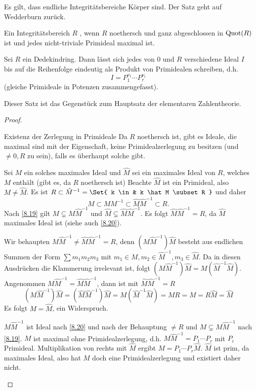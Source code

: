 \begin{nt*}
	Es gilt, dass endliche Integritätsbereiche Körper sind.
	Der Satz geht auf Wedderburn zurück. %
\end{nt*}

\begin{df} \label{8.16}
	Ein Integritätsbereich $R$ , wenn $R$ noethersch und ganz abgeschlossen in $\operatorname{Quot}(R)$ ist und jedes nicht-triviale Primideal maximal ist.
\end{df}

\begin{st} \label{8.17}
	Sei $R$ ein Dedekindring.
	Dann lässt sich jedes von $0$ und $R$ verschiedene Ideal $I$ bis auf die Reihenfolge eindeutig als Produkt von Primidealen schreiben, d.h.
	\[
		I = P_1^{\nu_1} \dotsb P_r^{\nu_r}
	\]
	(gleiche Primideale in Potenzen zusammengefasst).
	\begin{note}
		Dieser Satz ist das Gegenstück zum Hauptsatz der elementaren Zahlentheorie.
	\end{note}
	\begin{proof}
		\begin{seg}{Existenz der Zerlegung in Primideale}
			Da $R$ noethersch ist, gibt es Ideale, die maximal sind mit der Eigenschaft, keine Primidealzerlegung zu besitzen (und $\neq 0, R$ zu sein), falls es überhaupt solche gibt.

			Sei $M$ ein solches maximales Ideal und $\hat M$ sei ein maximales Ideal von $R$, welches $M$ enthält (gibt es, da $R$ noethersch ist)
			Beachte $\hat M$ ist ein Primideal, also $M \neq \hat M$.
			Es ist $R \subset \hat M^{-1} = \Set{ k \in  & k \hat M \subset R }$ und daher
			\[
				M \subset M M^{-1} \subset \hat M \hat M^{-1} \subset R.
			\]
			Nach \ref{8.19} gilt $M \subsetneq M \hat M^{-1}$ und $\hat M \subsetneq \hat M \hat M^{-1}$.
			Es folgt $\hat M \hat M^{-1} = R$, da $\hat M$ maximales Ideal ist (siehe auch \ref{8.20}).

			Wir behaupten $M \hat M^{-1} \neq \hat M \hat M^{-1} = R$, denn
			$(M \hat M^{-1}) \hat M$ besteht aus endlichen Summen der Form $\sum m_1 m_2 m_3$ mit $m_1 \in M, m_2 \in \hat M^{-1}, m_3 \in \hat M$.
			Da in diesen Ausdrücken die Klammerung irrelevant ist, folgt $(M \hat M^{-1}) \hat M = M (\hat M^{-1} \hat M)$.
			Angenommen $M \hat M^{-1} = \hat M \hat M^{-1}$, dann ist mit $\hat M \hat M^{-1} = R$
			\[
				(M \hat M^{-1}) \hat M
				= (\hat M \hat M^{-1}) \hat M
				= M (\hat M^{-1} \hat M)
				= M R
				= M
				= R \hat M
				= \hat M
			\]
			Es folgt $M = \hat M$, ein Widerspruch.

			$M \hat M^{-1}$ ist Ideal nach \ref{8.20} und nach der Behauptung $\neq R$ und $M \subsetneq M \hat M^{-1}$ nach \ref{8.19}.
			$M$ ist maximal ohne Primidealzerlegung, d.h. $M \hat M^{-1} = P_1 \dotsb P_r$ mit $P_i$ Primideal.
			Multiplikation von rechts mit $\hat M$ ergibt $M = P_1 \dotsb P_r \hat M$.
			$\hat M$ ist prim, da maximales Ideal, also hat $M$ doch eine Primidealzerlegung und existiert daher nicht.
		\end{seg}
	\end{proof}
\end{st}

